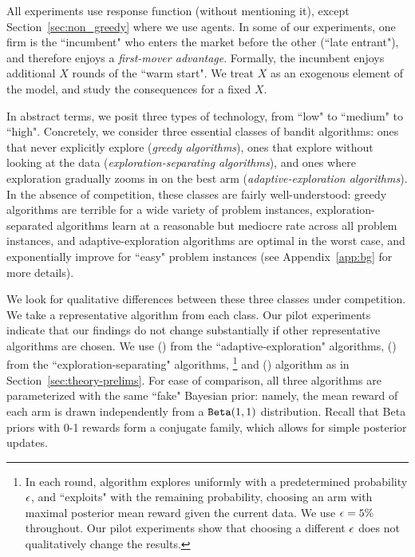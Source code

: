 \documentclass[../competing_bandits.tex]{subfiles}
\begin{document}
 All experiments use \HardMax response function (without mentioning it), except Section~\ref{sec:non_greedy} where we use \HardMaxRandom agents. In some of our experiments, one firm is the ``incumbent" who enters the market before the other (``late entrant"), and therefore enjoys a \emph{first-mover advantage}. Formally, the incumbent enjoys additional $X$ rounds of the ``warm start". We treat $X$ as an exogenous element of the model, and study the consequences for a fixed $X$.

 In abstract terms, we posit three types of technology, from ``low" to ``medium" to ``high". Concretely, we consider three essential classes of bandit algorithms: ones that never explicitly explore (\emph{greedy algorithms}), ones that explore without looking at the data (\emph{exploration-separating algorithms}), and ones where exploration gradually zooms in on the best arm (\emph{adaptive-exploration algorithms}). In the absence of competition, these classes are fairly well-understood: greedy algorithms are terrible for a wide variety of problem instances, exploration-separated algorithms learn at a reasonable but mediocre rate across all problem instances, and adaptive-exploration algorithms are optimal in the worst case, and exponentially improve for ``easy" problem instances (see Appendix~\ref{app:bg} for more details).

We look for qualitative differences between these three classes under competition. We take a representative algorithm from each class. Our pilot experiments indicate that our findings do not change substantially if other representative algorithms are chosen.
We use \Thompson (\TS) from the ``adaptive-exploration" algorithms, \DynamicEpsGreedy (\DEG) from the ``exploration-separating" algorithms,%
\footnote{In each round, \DynamicEpsGreedy algorithm explores uniformly with a predetermined probability $\epsilon$, and ``exploits" with the remaining probability, choosing an arm with maximal posterior mean reward given the current data. We use $\epsilon=5\%$ throughout. Our pilot experiments show that choosing a different $\epsilon$ does not qualitatively change the results.}  and \DynGreedy (\DG) algorithm  as in Section~\ref{sec:theory-prelims}. For ease of comparison, all three algorithms are parameterized with the same ``fake" Bayesian prior: namely, the mean reward of each arm is drawn independently from a $\mathtt{Beta}(1,1)$ distribution. Recall that Beta priors with 0-1 rewards form a conjugate family, which allows for simple posterior updates.
\end{document}
